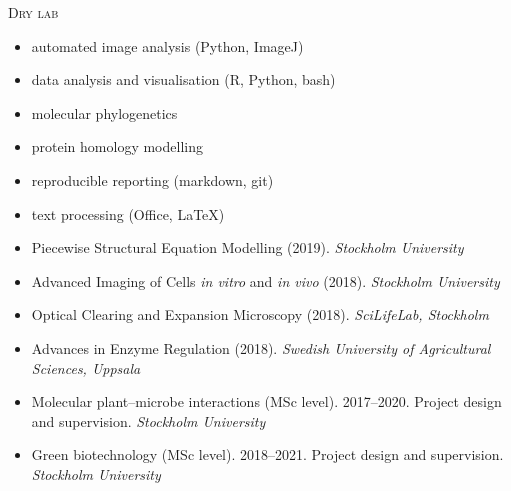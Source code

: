 \documentclass[11pt]{article}
\begin{document}
\textsc{\large{Dry lab}} 
\vspace{-0.175cm}
\begin{addmargin}[24pt]{0pt}
	\begin{multicols}{2}
		\raggedright
		\begin{itemize}[itemindent=-9pt,leftmargin=24pt]
			\itemsep-0.1cm
			\item automated image analysis (Python, ImageJ)
			\item data analysis and visualisation (R, Python, bash)
			\item molecular phylogenetics
			\item protein homology modelling
			\item reproducible reporting (markdown, git)
			\item text processing (Office, LaTeX)
		\end{itemize}
	\end{multicols}
\end{addmargin}
\vspace{0.5cm}

\vspace{-0.175cm}
\begin{itemize}[label={},itemindent=-9pt,leftmargin=24pt]
	\itemsep-0.1cm
	\item Piecewise Structural Equation Modelling (2019). \textit{Stockholm University}
	\item Advanced Imaging of Cells \textit{in vitro} and \textit{in vivo} (2018). \textit{Stockholm University} 
	\item Optical Clearing and Expansion Microscopy (2018). \textit{SciLifeLab, Stockholm} 	
	\item Advances in Enzyme Regulation (2018). \textit{Swedish University of Agricultural Sciences, Uppsala} 
\end{itemize}
\vspace{0.3cm}

\vspace{-0.175cm}
\begin{itemize}[label={},itemindent=-9pt,leftmargin=24pt]
	\itemsep-0.1cm
	\item Molecular plant--microbe interactions (MSc level). 2017--2020. Project design and supervision. \textit{Stockholm University} 	
	\item Green biotechnology (MSc level). 2018--2021. Project design and supervision. \textit{Stockholm University} 
\end{itemize}
\vspace{0.3cm}
\end{document}
